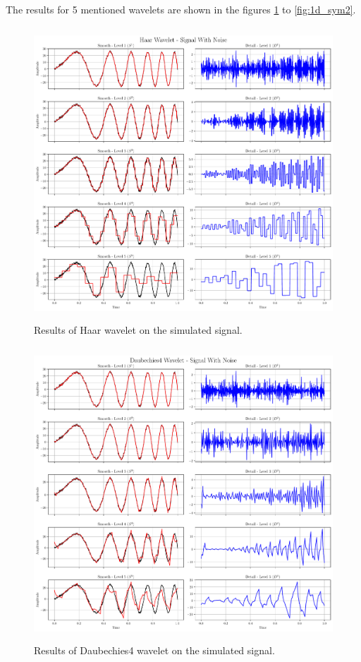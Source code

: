 \documentclass[12pt]{article}
\begin{document}
	The results for 5 mentioned wavelets are shown in the figures \ref{fig:1d_haar} to \ref{fig:1d_sym2}.
	
	\begin{figure}[!h]
		\centering
		\includegraphics[height=11cm]{../Tests/Outputs/HaarWavelet_SignalWithNoise.pdf}
		\caption{Results of Haar wavelet on the simulated signal.}
		\label{fig:1d_haar}
	\end{figure}

	\begin{figure}[!h]
		\centering
		\includegraphics[height=11cm]{../Tests/Outputs/Daubechies4Wavelet_SignalWithNoise.pdf}
		\caption{Results of Daubechies4 wavelet on the simulated signal.}
		\label{fig:1d_db4}
	\end{figure}	
	
\end{document}
